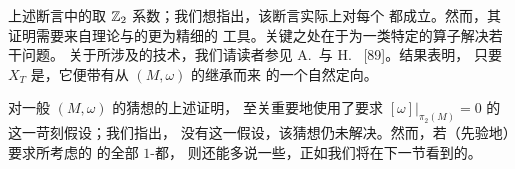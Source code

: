 上述断言中的\trCohomology{}取 $\mathbb{Z}_{2}$ 系数；我们想指出，该断言实际上对每个%
\trCoefficientField{}都成立。然而，其证明需要来自\trFredholm{}理论与\trAlgebraicTopology{}的更为精细的%
工具。关键之处在于为一类特定的\trFredholm{}算子解决若干\trOrientation{}问题。%
关于所涉及的技术，我们请读者参见 A.~\trFloer{}与 H.~\trHofer{} [89]。结果表明，%
只要 $X_{T}$ 是\trManifold，它便带有从 $(M,\omega)$ 的\trOrientation{}继承而来%
的一个自然定向。

对一般\trSymplecticManifold{} $(M,\omega)$ 的\trArnold{}猜想的上述证明，%
至关重要地使用了要求 $[\omega]\big|_{\pi_{2}(M)}=0$ 的这一苛刻假设；我们指出，%
没有这一假设，该猜想仍未解决。然而，若（先验地）要求所考虑的%
\trHamiltonianVectorField{}的全部 $1$-\trPeriodicSolution{}都\trNondegenerate，%
则还能多说一些，正如我们将在下一节看到的。
